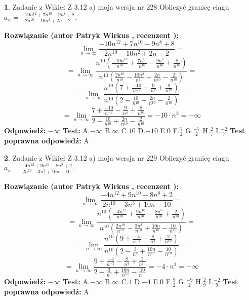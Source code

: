 \documentclass[12pt, a4paper]{article}
\theoremstyle{definition} %
\newtheorem{zad}{}
\newcommand{\zadStart}[1]{\begin{zad}#1\newline}
\newcommand{\zadStop}{\end{zad}}
\newcommand{\rozwStart}[2]{\noindent \textbf{Rozwiązanie (autor #1 , recenzent #2): }\newline}
\newcommand{\rozwStop}{\newline}
\newcommand{\odpStart}{\noindent \textbf{Odpowiedź:}\newline}
\newcommand{\odpStop}{\newline}
\newcommand{\testStart}{\noindent \textbf{Test:}\newline}
\newcommand{\testStop}{\newline}
\newcommand{\kluczStart}{\noindent \textbf{Test poprawna odpowiedź:}\newline}
\newcommand{\kluczStop}{\newline}
\begin{document}
\zadStart{Zadanie z Wikieł Z 3.12 a) moja wersja nr 228}
Obliczyć granicę ciągu $a_{n}=\frac{-10n^{12}+7n^{10}-9n^{8}+8}{2n^{10}-10n^{2}+2n-2}$.
\zadStop
\rozwStart{Patryk Wirkus}{}
$$\lim\limits_{n\to\infty}\frac{-10n^{12}+7n^{10}-9n^{8}+8}{2n^{10}-10n^{2}+2n-2}=$$
$$=\lim\limits_{n\to\infty}\frac{n^{10}\left(\frac{-10n^{12}}{n^{10}}+\frac{7n^{10}}{n^{10}}-\frac{9n^{8}}{n^{10}}+\frac{8}{n^{10}}\right)}{n^{10}\left(\frac{2n^{10}}{n^{10}}-\frac{10n^{2}}{n^{10}}+\frac{2n}{n^{10}}-\frac{2}{n^{10}}\right)}=$$
$$=\lim\limits_{n\to\infty}\frac{n^{10}\left(7+\frac{-10}{n^{-2}}-\frac{9}{n^{4}}+\frac{8}{n^{10}}\right)}
{n^{10}\left(2-\frac{10}{n^{10}}+\frac{2n}{n^{10}}-\frac{2}{n^{10}}\right)}=$$
$$=\lim\limits_{n\to\infty}\frac{7+\frac{-10}{n^{-2}}-\frac{9}{n^{4}}+\frac{8}{n^{10}}}{2-\frac{10}{n^{10}}+\frac{2n}{n^{10}}-\frac{2}{n^{10}}}=-10\cdot n^{2} = -\infty$$
\rozwStop
\odpStart
$-\infty$
\odpStop
\testStart
A.$-\infty$
B.$\infty$
C.$10$
D.$-10$
E.$0$
F.$\frac{7}{2}$
G.$\frac{-7}{2}$
H.$\frac{2}{7}$
I.$\frac{-2}{7}$
\testStop
\kluczStart
A
\kluczStop



\zadStart{Zadanie z Wikieł Z 3.12 a) moja wersja nr 229}
Obliczyć granicę ciągu $a_{n}=\frac{-4n^{12}+9n^{10}-8n^{8}+2}{2n^{10}-3n^{3}+10n-10}$.
\zadStop
\rozwStart{Patryk Wirkus}{}
$$\lim\limits_{n\to\infty}\frac{-4n^{12}+9n^{10}-8n^{8}+2}{2n^{10}-3n^{3}+10n-10}=$$
$$=\lim\limits_{n\to\infty}\frac{n^{10}\left(\frac{-4n^{12}}{n^{10}}+\frac{9n^{10}}{n^{10}}-\frac{8n^{8}}{n^{10}}+\frac{2}{n^{10}}\right)}{n^{10}\left(\frac{2n^{10}}{n^{10}}-\frac{3n^{3}}{n^{10}}+\frac{10n}{n^{10}}-\frac{10}{n^{10}}\right)}=$$
$$=\lim\limits_{n\to\infty}\frac{n^{10}\left(9+\frac{-4}{n^{-2}}-\frac{8}{n^{4}}+\frac{2}{n^{10}}\right)}
{n^{10}\left(2-\frac{3}{n^{9}}+\frac{10n}{n^{10}}-\frac{10}{n^{10}}\right)}=$$
$$=\lim\limits_{n\to\infty}\frac{9+\frac{-4}{n^{-2}}-\frac{8}{n^{4}}+\frac{2}{n^{10}}}{2-\frac{3}{n^{9}}+\frac{10n}{n^{10}}-\frac{10}{n^{10}}}=-4\cdot n^{2} = -\infty$$
\rozwStop
\odpStart
$-\infty$
\odpStop
\testStart
A.$-\infty$
B.$\infty$
C.$4$
D.$-4$
E.$0$
F.$\frac{9}{2}$
G.$\frac{-9}{2}$
H.$\frac{2}{9}$
I.$\frac{-2}{9}$
\testStop
\kluczStart
A
\kluczStop
\end{document}
